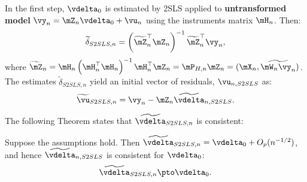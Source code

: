 In the first step, $\vdelta_0$ is estimated by 2SLS applied to \textbf{untransformed model}  $\vy_n = \mZ_n\vdelta_0 + \vu_n$ using the instruments matrix $\mH_n$. Then:
\begin{equation*}
\widetilde{\delta}_{S2SLS, n} = \left(\widetilde{\mZ}^\top_n\mZ_n\right)^{-1}\widetilde{\mZ}^\top_n\vy_n, 
\end{equation*}
%
where $\widetilde{\mZ}_n = \mH_n\left(\mH^\top_n\mH_n\right)^{-1}\mH^\top_n\mZ_n = \mP_{H, n}\mZ_n= (\mX_n, \widetilde{\mW_n\vy_n})$. The estimates $\widetilde{\delta}_{S2SLS, n}$ yield an initial vector of residuals, $\vu_{n, S2SLS}$ as:
\begin{equation*}
\widetilde{\vu}_{S2SLS, n} = \vy_n - \mZ_n\widetilde{\vdelta}_{n, S2SLS}.
\end{equation*}

The following Theorem states that $\widetilde{\vdelta}_{S2SLS, n}$ is consistent:

\begin{theorem}\label{teo:Consistency-2sls}
Suppose the assumptions hold. Then $\widetilde{\vdelta}_{S2SLS, n} = \vdelta_0 + O_p(n^{-1/2})$, and hence $\widetilde{\vdelta}_{n, S2SLS}$ is consistent for $\vdelta_0$:
\begin{equation*}
\widetilde{\vdelta}_{S2SLS, n}\pto \vdelta_0.
\end{equation*}
\end{theorem}

